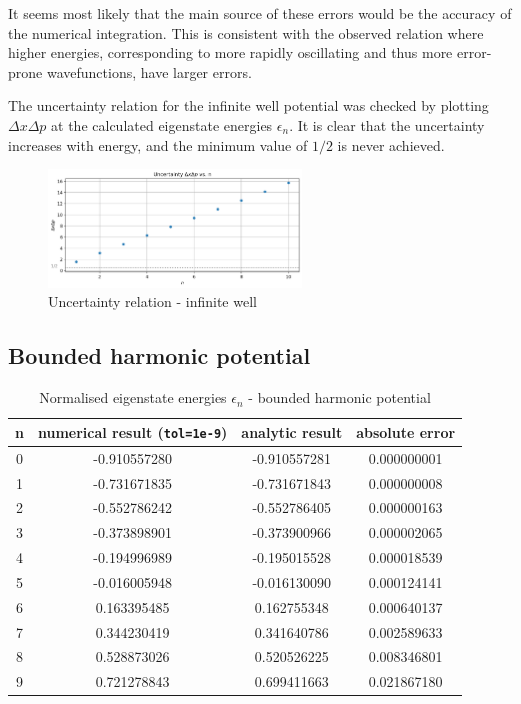 \documentclass[11pt]{article}
\begin{document}
\vspace{.4cm}
It seems most likely that the main source of these errors would be the accuracy of
the numerical integration. This is consistent with the observed relation where 
higher energies, corresponding to more rapidly oscillating and thus more error-prone
wavefunctions, have larger errors.

The uncertainty relation for the infinite well potential was checked by plotting 
$\Delta x \Delta p$ at the calculated eigenstate energies $\epsilon_n$.
It is clear that the uncertainty increases with energy, and the minimum
value of $1/2$ is never achieved.

\begin{figure}[h]
  \centering
  \includegraphics*[width=0.6\textwidth]{uncertainty1.png}
  \caption{Uncertainty relation - infinite well}
\end{figure}

\subsection{Bounded harmonic potential}

\begin{table}[htbp]
  \centering
  \caption{Normalised eigenstate energies $\epsilon_n$ - bounded harmonic potential}
  \vspace{-.3cm}
  \begin{tabular}{c|c|c|c}
    n & numerical result (\texttt{tol=1e-9}) & analytic result & absolute error\\
    \hline
    0 &-0.910557280&-0.910557281 & 0.000000001\\
    1 &-0.731671835&-0.731671843 & 0.000000008\\
    2 &-0.552786242&-0.552786405 & 0.000000163\\
    3 &-0.373898901&-0.373900966 & 0.000002065\\
    4 &-0.194996989&-0.195015528 & 0.000018539\\
    5 &-0.016005948&-0.016130090 & 0.000124141\\
    6 & 0.163395485& 0.162755348 & 0.000640137\\
    7 & 0.344230419& 0.341640786 & 0.002589633\\
    8 & 0.528873026& 0.520526225 & 0.008346801\\
    9 & 0.721278843& 0.699411663 & 0.021867180
  \end{tabular}
  \label{tab:2}
\end{table}
\end{document}
